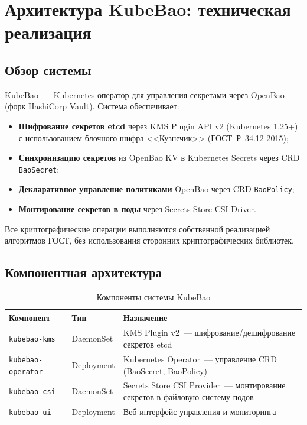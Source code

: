 \documentclass[a4paper,14pt]{extarticle}
\begin{document}
\section{Архитектура KubeBao: техническая реализация}

\subsection{Обзор системы}

KubeBao~--- Kubernetes-оператор для управления секретами через OpenBao (форк HashiCorp Vault). Система обеспечивает:

\begin{itemize}
    \item \textbf{Шифрование секретов etcd} через KMS Plugin API v2 (Kubernetes 1.25+) с использованием блочного шифра <<Кузнечик>> (ГОСТ~Р~34.12-2015);
    \item \textbf{Синхронизацию секретов} из OpenBao KV в Kubernetes Secrets через CRD \texttt{BaoSecret};
    \item \textbf{Декларативное управление политиками} OpenBao через CRD \texttt{BaoPolicy};
    \item \textbf{Монтирование секретов в поды} через Secrets Store CSI Driver.
\end{itemize}

Все криптографические операции выполняются собственной реализацией алгоритмов ГОСТ, без использования сторонних криптографических библиотек.

\subsection{Компонентная архитектура}

\begin{table}[h]
\centering
\caption{Компоненты системы KubeBao}
\begin{tabular}{@{}llp{8cm}@{}}
\toprule
\textbf{Компонент} & \textbf{Тип} & \textbf{Назначение} \\
\midrule
\texttt{kubebao-kms} & DaemonSet & KMS Plugin v2~--- шифрование/дешифрование секретов etcd \\
\texttt{kubebao-operator} & Deployment & Kubernetes Operator~--- управление CRD (BaoSecret, BaoPolicy) \\
\texttt{kubebao-csi} & DaemonSet & Secrets Store CSI Provider~--- монтирование секретов в файловую систему подов \\
\texttt{kubebao-ui} & Deployment & Веб-интерфейс управления и мониторинга \\
\bottomrule
\end{tabular}
\end{table}
\end{document}
